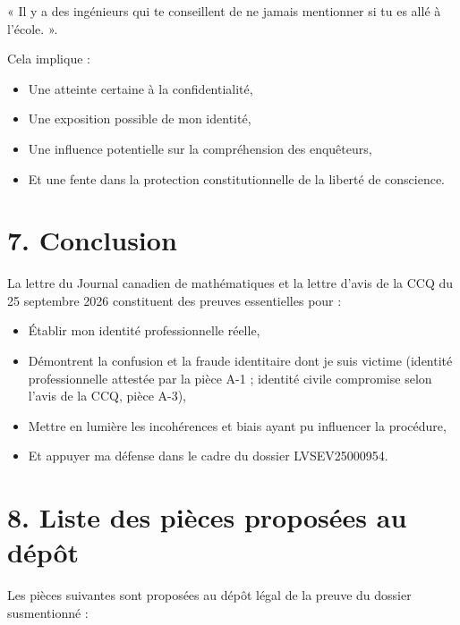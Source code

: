 \documentclass[12pt,a4paper]{article}
\begin{document}
« Il y a des ingénieurs qui te conseillent de ne jamais mentionner si tu es allé à l’école. ».

Cela implique :

\begin{itemize}
  \item Une atteinte certaine à la confidentialité,
  \item Une exposition possible de mon identité,
  \item Une influence potentielle sur la compréhension des enquêteurs,
  \item Et une fente dans la protection constitutionnelle de la liberté de conscience.
\end{itemize}

\section*{7. Conclusion}
La lettre du Journal canadien de mathématiques et la lettre d’avis de la CCQ du 25 septembre 2026 constituent des preuves essentielles pour :

\begin{itemize}
  \item Établir mon identité professionnelle réelle,
  \item Démontrent la confusion et la fraude identitaire dont je suis victime (identité professionnelle attestée par la pièce A-1 ; identité civile compromise selon l’avis de la CCQ, pièce A-3),
  \item Mettre en lumière les incohérences et biais ayant pu influencer la procédure,
  \item Et appuyer ma défense dans le cadre du dossier LVSEV25000954.
\end{itemize}

\section*{8. Liste des pièces proposées au dépôt}
Les pièces suivantes sont proposées au dépôt légal de la preuve du dossier susmentionné :
\end{document}
